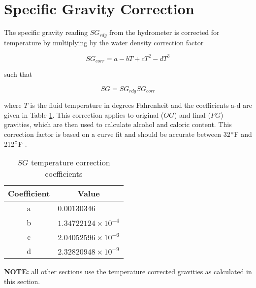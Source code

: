 \documentclass[../main.tex]{subfiles}
\begin{document}
\section{Specific Gravity Correction}
    The specific gravity reading $SG_{rdg}$ from the hydrometer is corrected for temperature by multiplying by the water density correction factor
    
    \begin{equation}
        SG_{corr} = a - b T + c T^{2} - d T^{3}
    \end{equation}
    
    such that
    
    \begin{equation}
        SG = SG_{rdg} SG_{corr}
    \end{equation}
    
    where $T$ is the fluid temperature in degrees Fahrenheit and the coefficients a-d are given in Table \ref{tab:sgcorr}. This correction applies to original ($OG$) and final ($FG$) gravities, which are then used to calculate alcohol and caloric content. This correction factor is based on a curve fit and should  be accurate between 32${}^{\circ}$F and 212${}^{\circ}$F \cite{hall_1995}.
    
    \begin{table}[H]
        \centering
        \caption{$SG$ temperature correction coefficients}
        \begin{tabular}{cl}
             Coefficient & \multicolumn{1}{c}{Value} \\
             \hline
             a & 0.00130346 \\
             b & $1.34722124 \times 10^{-4}$ \\
             c & $2.04052596 \times 10^{-6}$ \\
             d & $2.32820948 \times 10^{-9}$
        \end{tabular}
        \label{tab:sgcorr}
    \end{table}

    \textbf{NOTE:} all other sections use the temperature corrected gravities as calculated in this section.
    
\end{document}
